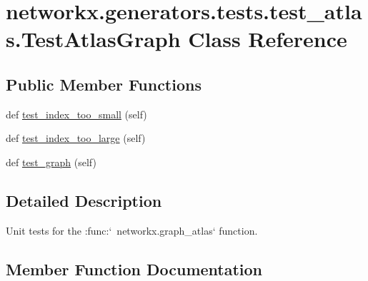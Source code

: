 \hypertarget{classnetworkx_1_1generators_1_1tests_1_1test__atlas_1_1TestAtlasGraph}{}\section{networkx.\+generators.\+tests.\+test\+\_\+atlas.\+Test\+Atlas\+Graph Class Reference}
\label{classnetworkx_1_1generators_1_1tests_1_1test__atlas_1_1TestAtlasGraph}
\subsection*{Public Member Functions}
\begin{DoxyCompactItemize}
\item 
def \hyperlink{classnetworkx_1_1generators_1_1tests_1_1test__atlas_1_1TestAtlasGraph_a69e29922b7b0222023e6a457a4ae2857}{test\+\_\+index\+\_\+too\+\_\+small} (self)
\item 
def \hyperlink{classnetworkx_1_1generators_1_1tests_1_1test__atlas_1_1TestAtlasGraph_aec2ef5512a7ef50827eaa54bd52635e8}{test\+\_\+index\+\_\+too\+\_\+large} (self)
\item 
def \hyperlink{classnetworkx_1_1generators_1_1tests_1_1test__atlas_1_1TestAtlasGraph_a9703503a3519356cf2b12ac71a936988}{test\+\_\+graph} (self)
\end{DoxyCompactItemize}


\subsection{Detailed Description}
\begin{DoxyVerb}Unit tests for the :func:`~networkx.graph_atlas` function.\end{DoxyVerb}
 

\subsection{Member Function Documentation}
\mbox{\label{classnetworkx_1_1generators_1_1tests_1_1test__atlas_1_1TestAtlasGraph_a9703503a3519356cf2b12ac71a936988}} 

